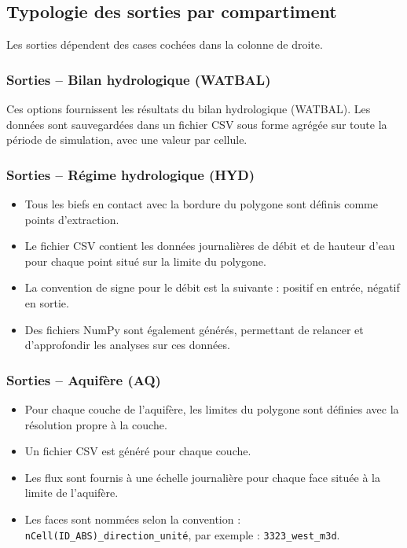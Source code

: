 \subsection*{Typologie des sorties par compartiment}
Les sorties dépendent des cases cochées dans la colonne de droite.

\subsubsection*{Sorties -- Bilan hydrologique (WATBAL)}
    

Ces options fournissent les résultats du bilan hydrologique (WATBAL). Les données sont sauvegardées dans un fichier CSV sous forme agrégée sur toute la période de simulation, avec une valeur par cellule.

\subsubsection*{Sorties -- Régime hydrologique (HYD)}

\begin{itemize}
    \item Tous les biefs en contact avec la bordure du polygone sont définis comme points d’extraction.
    \item Le fichier CSV contient les données journalières de débit et de hauteur d’eau pour chaque point situé sur la limite du polygone.
    \item La convention de signe pour le débit est la suivante : positif en entrée, négatif en sortie.
    \item Des fichiers NumPy sont également générés, permettant de relancer et d’approfondir les analyses sur ces données.
\end{itemize}

\subsubsection*{Sorties -- Aquifère (AQ)}

\begin{itemize}
    \item Pour chaque couche de l’aquifère, les limites du polygone sont définies avec la résolution propre à la couche.
    \item Un fichier CSV est généré pour chaque couche.
    \item Les flux sont fournis à une échelle journalière pour chaque face située à la limite de l’aquifère.
    \item Les faces sont nommées selon la convention : \texttt{nCell(ID\_ABS)\_direction\_unité}, par exemple : \texttt{3323\_west\_m3d}.
\end{itemize}

